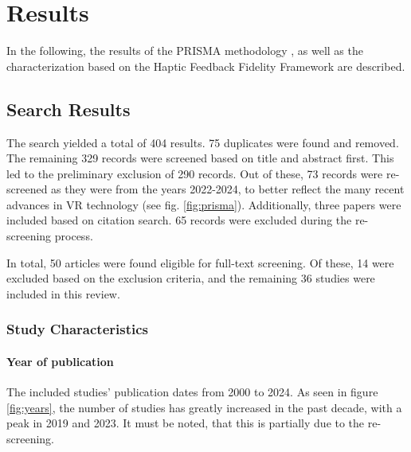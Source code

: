 \section{Results}
\label{sec:results}

In the following, the results of the PRISMA methodology \cite{Page2021TheReviews}, as well as the characterization based on the Haptic Feedback Fidelity Framework \cite{Muender2022HapticReality} are described.


\subsection{Search Results}

The search yielded a total of 404 results. 75 duplicates were found and removed. The remaining 329 records were screened based on title and abstract first. This led to the preliminary exclusion of 290 records. Out of these, 73 records were re-screened as they were from the years 2022-2024, to better reflect the many recent advances in VR technology (see fig. \ref{fig:prisma}). 
Additionally, three papers were included based on citation search. 65 records were excluded during the re-screening process.

In total, 50 articles were found eligible for full-text screening. Of these, 14 were excluded based on the exclusion criteria, and the remaining 36 studies were included in this review.


\subsubsection{Study Characteristics}
\paragraph{Year of publication}
The included studies' publication dates from 2000 to 2024. As seen in figure \ref{fig:years}, the number of studies has greatly increased in the past decade, with a peak in 2019 and 2023. It must be noted, that this is partially due to the re-screening. 


